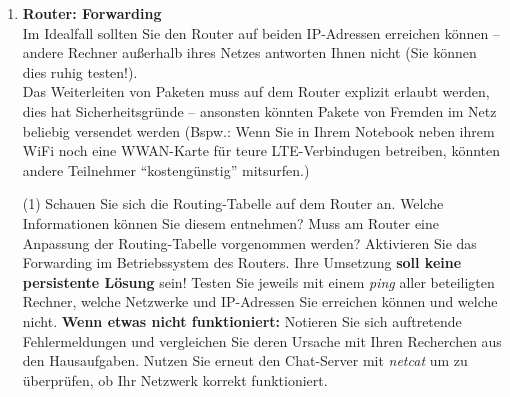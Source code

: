 \documentclass[paper=a4,fontsize=11pt]{scrartcl}%
\numberwithin{equation}{section}
\begin{document}
\begin{enumerate}
	\begin{lstlisting}[style=Bash, language=Bash, label={netcat_server}]
#Server port > 1024 
nc -l -p <port_number> <ip_of_server>
#example
nc -l -p 4711 10.0.0.1
		\end{lstlisting}
		
		\begin{lstlisting}[style=Bash, language=Bash, label={netcat_client}]
#Client 
nc <ip_of_server> <port_number>
#example
nc 10.0.0.1 4711
		\end{lstlisting}
	\item \textbf{Router: Forwarding}\\
	Im Idealfall sollten Sie den Router auf beiden IP-Adressen erreichen können -- andere Rechner außerhalb ihres Netzes antworten Ihnen nicht (Sie können dies ruhig testen!).\\
	Das Weiterleiten von Paketen muss auf dem Router explizit erlaubt werden, dies hat Sicherheitsgründe -- ansonsten könnten Pakete von Fremden im Netz beliebig versendet werden (Bspw.: Wenn Sie in Ihrem Notebook neben ihrem WiFi noch eine WWAN-Karte für teure LTE-Verbindugen betreiben, könnten andere Teilnehmer \enquote{kostengünstig} mitsurfen.)
	\begin{tasks}(1)
		\task Schauen Sie sich die Routing-Tabelle auf dem Router an. Welche Informationen können Sie diesem entnehmen?
        	\task Muss am Router eine Anpassung der Routing-Tabelle vorgenommen werden?
        	\task Aktivieren Sie das Forwarding im Betriebssystem des Routers. Ihre Umsetzung \textbf{soll keine persistente Lösung} sein! 
		\task Testen Sie jeweils mit einem \emph{ping} aller beteiligten Rechner, welche Netzwerke und IP-Adressen Sie erreichen können und welche nicht.
		\task \textbf{Wenn etwas nicht funktioniert:} Notieren Sie sich auftretende Fehlermeldungen und vergleichen Sie deren Ursache mit Ihren Recherchen aus den Hausaufgaben.
		\task Nutzen Sie erneut den Chat-Server mit \emph{netcat} um zu überprüfen, ob Ihr Netzwerk korrekt funktioniert.
	\end{tasks}
\end{enumerate}
\end{document}
